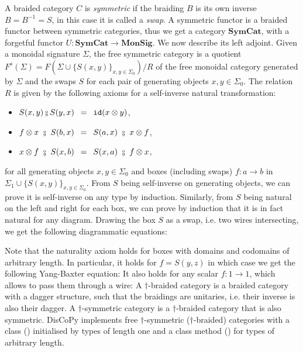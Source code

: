 A braided category $C$ is \emph{symmetric} if the braiding $B$ is its own inverse $B = B^{-1} = S$, in this case it is called a \emph{swap}.
A symmetric functor is a braided functor between symmetric categories, thus we get a category $\mathbf{SymCat}$, with a forgetful functor $U : \mathbf{SymCat} \to \mathbf{MonSig}$.
We now describe its left adjoint.
Given a monoidal signature $\Sigma$, the free symmetric category is a quotient $F^s(\Sigma) = F(\Sigma \cup \{ S(x, y) \}_{x, y \in \Sigma_0}) / R$ of the free monoidal category generated by $\Sigma$ and the swaps $S$ for each pair of generating objects $x, y \in \Sigma_0$.
The relation $R$ is given by the following axioms for a self-inverse natural transformation:
\begin{itemize}
\item $S(x, y) \fcmp S(y, x) \s = \s \id(x \otimes y)$,
\item $f \otimes x \ \fcmp \ S(b, x) \s = \s S(a, x) \ \fcmp \ x \otimes f$,
\item $x \otimes f \ \fcmp \ S(x, b) \s = \s S(x, a) \ \fcmp \ f \otimes x$,
\end{itemize}
for all generating objects $x, y \in \Sigma_0$ and boxes (including swaps) $f : a \to b$ in $\Sigma_1 \cup \{ S(x, y) \}_{x, y \in \Sigma_0}$.
From $S$ being self-inverse on generating objects, we can prove it is self-inverse on any type by induction.
Similarly, from $S$ being natural on the left and right for each box, we can prove by induction that it is in fact natural for any diagram.
Drawing the box $S$ as a swap, i.e. two wires intersecting, we get the following diagrammatic equations:
\begin{center}
\hspace{100pt}
\end{center}
Note that the naturality axiom holds for boxes with domains and codomains of arbitrary length.
In particular, it holds for $f = S(y, z)$ in which case we get the following Yang-Baxter equation:
It also holds for any scalar $f : 1 \to 1$, which allows to pass them through a wire:
A $\dagger$-braided category is a braided category with a dagger structure, such that the braidings are unitaries, i.e. their inverse is also their dagger.
A $\dagger$-symmetric category is a $\dagger$-braided category that is also symmetric.
DisCoPy implements free $\dagger$-symmetric ($\dagger$-braided) categories with a class  () initialised by types of length one and a class method  () for types of arbitrary length.

